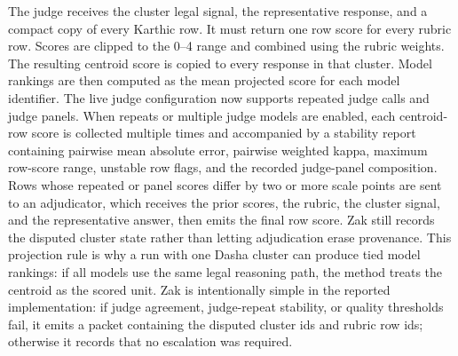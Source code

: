 The judge receives the cluster legal signal, the representative response, and a
compact copy of every Karthic row. It must return one row score for every rubric
row. Scores are clipped to the 0--4 range and combined using the rubric weights.
The resulting centroid score is copied to every response in that cluster. Model
rankings are then computed as the mean projected score for each model identifier.
The live judge configuration now supports repeated judge calls and judge panels.
When repeats or multiple judge models are enabled, each centroid-row score is
collected multiple times and accompanied by a stability report containing
pairwise mean absolute error, pairwise weighted kappa, maximum row-score range,
unstable row flags, and the recorded judge-panel composition. Rows whose
repeated or panel scores differ by two or more scale points are sent to an
adjudicator, which receives the prior scores, the rubric, the cluster signal,
and the representative answer, then emits the final row score. Zak still records
the disputed cluster state rather than letting adjudication erase provenance.
This projection rule is why a run with one Dasha cluster can produce tied model
rankings: if all models use the same legal reasoning path, the method treats the
centroid as the scored unit. Zak is intentionally simple in the reported
implementation: if judge agreement, judge-repeat stability, or quality
thresholds fail, it emits a packet containing the disputed cluster ids and
rubric row ids; otherwise it records that no escalation was required.
